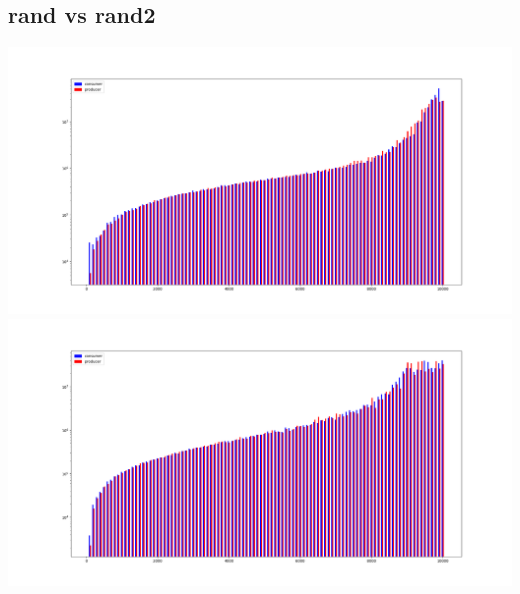 \documentclass[11pt, a4paper]{article}
\begin{document}
\begin{center}
\section{rand vs rand2}
\includegraphics[scale=0.3]{100_100_10000_rand_norm}
\includegraphics[scale=0.3]{100_100_10000_rand2_norm}


\end{center}
\end{document}

